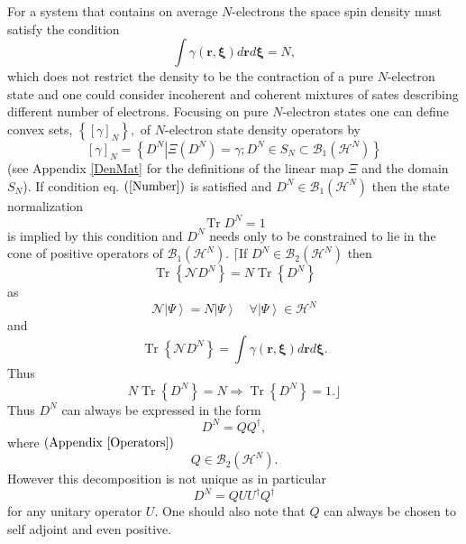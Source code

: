 \documentclass[aps,preprint]{revtex4}%
\begin{document}
For a system that contains on average $N$-electrons the space spin density
must satisfy the condition
\begin{equation}
\int\gamma\left(  \mathbf{r,\xi}\right)  d\mathbf{r}d\mathbf{\xi}=N,
\label{Number}%
\end{equation}
which does not restrict the density to be the contraction of a pure
$N$-electron state and one could consider incoherent and coherent mixtures of
sates describing different number of electrons. Focusing on pure $N$-electron
states one can define convex sets, $\left\{  \left[  \gamma\right]
_{N}\right\}  ,$ of $N$-electron state density operators by
\begin{equation}
\left[  \gamma\right]  _{N}=\left\{  \left.  D^{N}\right\vert \Xi\left(
D^{N}\right)  =\gamma;D^{N}\in S_{N}\subset\mathcal{B}_{1}\left(
\mathcal{H}^{N}\right)  \right\}
\end{equation}
(see Appendix \ref{DenMat} for the definitions of the linear map $\Xi$ and the
domain $S_{N}$). If condition eq. $\left(  \ref{Number}\right)  $ is satisfied
and $D^{N}\in\mathcal{B}_{1}\left(  \mathcal{H}^{N}\right)  $ then the state
normalization
\begin{equation}
\operatorname{Tr}D^{N}=1
\end{equation}
is implied by this condition and $D^{N}$ needs only to be constrained to lie
in the cone of positive operators of $\mathcal{B}_{1}\left(  \mathcal{H}%
^{N}\right)  $. $\lceil$If $D^{N}\in\mathcal{B}_{2}\left(  \mathcal{H}%
^{N}\right)  $ then
\begin{equation}
\operatorname{Tr}\left\{  \mathcal{N}D^{N}\right\}  =N\operatorname{Tr}%
\left\{  D^{N}\right\}
\end{equation}
as
\begin{equation}
\mathcal{N}\left\vert \Psi\right\rangle =N\left\vert \Psi\right\rangle
\quad\forall\left\vert \Psi\right\rangle \in\mathcal{H}^{N}%
\end{equation}
and
\begin{equation}
\operatorname{Tr}\left\{  \mathcal{N}D^{N}\right\}  =\int\gamma\left(
\mathbf{r,\xi}\right)  d\mathbf{r}d\mathbf{\xi.}%
\end{equation}
Thus
\begin{equation}
N\operatorname{Tr}\left\{  D^{N}\right\}  =N\Rightarrow\operatorname{Tr}%
\left\{  D^{N}\right\}  =1.\rfloor
\end{equation}
Thus $D^{N}$ can always be expressed in the form
\begin{equation}
D^{N}=QQ^{\dagger},
\end{equation}
where $\left(  \text{Appendix \ref{Operators}}\right)  $
\begin{equation}
Q\in\mathcal{B}_{2}\left(  \mathcal{H}^{N}\right)  .
\end{equation}
However this decomposition is not unique as in particular
\begin{equation}
D^{N}=QUU^{\dagger}Q^{\dagger}%
\end{equation}
for any unitary operator $U$. One should also note that $Q$ can always be
chosen to self adjoint and even positive.
\end{document}
